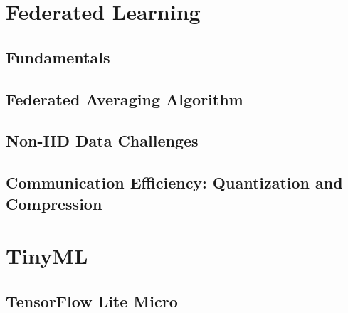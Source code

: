 \section{Federated Learning}
\label{sec:fl-theory}

\subsection{Fundamentals}

\subsection{Federated Averaging Algorithm}
\begin{algorithm}[H]
  \caption{\gls{fedavg}~\cite{mcmahan2017communication}}
  \label{alg:fedavg}
\end{algorithm}

\subsection{Non-IID Data Challenges}

\subsection{Communication Efficiency: Quantization and Compression}

\section{TinyML}
\label{sec:tinyml-theory}

\subsection{TensorFlow Lite Micro}

